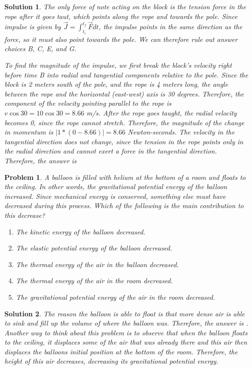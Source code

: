 \documentclass[12pt]{article}
\newcommand{\clearpts}{\addtocounter{tpts}{\value{cpts}} \setcounter{cpts}{0}}
\newcommand{\pts}[1]{\clearpts \setcounter{cpts}{#1}}
\newtheorem*{solution}{Solution}
\theoremstyle{mystyle}
\newtheorem{pproblem}{Problem}
\begin{document}
\begin{solution}
    The only force of note acting on the block is the tension force in the rope after it goes taut, which points along the rope and towards the pole. Since impulse is given by $\vec{J} = \int_{t_i}^{t_f} \vec{F} dt$, the impulse points in the same direction as the force, so it must also point towards the pole. We can therefore rule out answer choices B, C, E, and G. 
    
    To find the magnitude of the impulse, we first break the block's velocity right before time B into radial and tangential components relative to the pole. Since the block is 2 meters south of the pole, and the rope is 4 meters long, the angle between the rope and the horizontal (east-west) axis is 30 degrees. Therefore, the component of the velocity pointing parallel to the rope is $v\cos 30 = 10\cos30 = 8.66$ m/s. After the rope goes taught, the radial velocity becomes 0, since the rope cannot stretch. Therefore, the magnitude of the change in momentum is $|1*(0-8.66)| = 8.66$ Newton-seconds. The velocity in the tangential direction does not change, since the tension in the rope points only in the radial direction and cannot exert a force in the tangential direction. Therefore, the answer is 
\end{solution}


\pts{2}
\begin{pproblem}
    A balloon is filled with helium at the bottom of a room and floats to the ceiling. In other words, the gravitational potential energy of the balloon increased. Since mechanical energy is conserved, something else must have decreased during this process. Which of the following is the main contribution to this decrease?
    \begin{enumerate}[label=\Alph*)]
        \item The kinetic energy of the balloon decreased.
        \item The elastic potential energy of the balloon decreased.
        \item The thermal energy of the air in the balloon decreased.
        \item The thermal energy of the air in the room decreased.
        \item The gravitational potential energy of the air in the room decreased.
    \end{enumerate}
\end{pproblem}
\begin{solution}
    The reason the balloon is able to float is that more dense air is able to sink and fill up the volume of where the balloon was. Therefore, the answer is . Another way to think about this problem is to observe that when the balloon floats to the ceiling, it displaces some of the air that was already there and this air then displaces the balloons initial position at the bottom of the room. Therefore, the height of this air decreases, decreasing its gravitational potential energy.
\end{solution}
\end{document}
